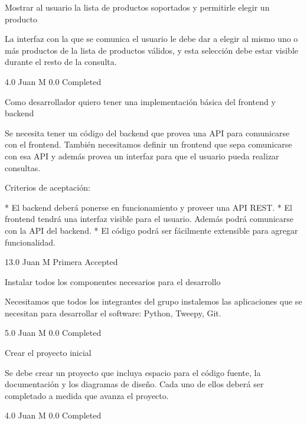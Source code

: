 		{Mostrar al usuario la lista de productos soportados y permitirle elegir un producto} %
		{La interfaz con la que se comunica el usuario le debe dar a elegir al mismo
uno o más productos de la lista de productos válidos, y esta selección debe
estar visible durante el resto de la consulta.

} %
		{4.0} %
		{Juan M} %
		{0.0} %
		{Completed} %


\vspace{20pt}

	{Como desarrollador quiero tener una implementación básica del frontend y backend} %
	{Se necesita tener un código del backend que provea una API para comunicarse
con el frontend. También necesitamos definir un frontend que sepa comunicarse
con esa API y además provea un interfaz para que el usuario pueda realizar
consultas.

  
Criterios de aceptación:

* El backend deberá ponerse en funcionamiento y proveer una API REST.  
* El frontend tendrá una interfaz visible para el usuario. Además podrá comunicarse con la API del backend.  
* El código podrá ser fácilmente extensible para agregar funcionalidad.

} %
	{} %
	{13.0} %
	{Juan M} %
	{Primera} %
	{Accepted} %

		{Instalar todos los componentes necesarios para el desarrollo} %
		{Necesitamos que todos los integrantes del grupo instalemos las aplicaciones
que se necesitan para desarrollar el software: Python, Tweepy, Git.

} %
		{5.0} %
		{Juan M} %
		{0.0} %
		{Completed} %

		{Crear el proyecto inicial} %
		{Se debe crear un proyecto que incluya espacio para el código fuente, la
documentación y los diagramas de diseño. Cada uno de ellos deberá ser
completado a medida que avanza el proyecto.

} %
		{4.0} %
		{Juan M} %
		{0.0} %
		{Completed} %

